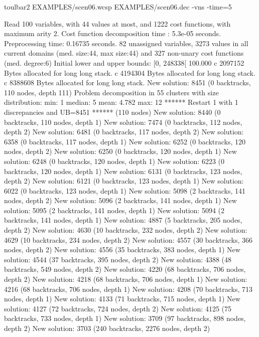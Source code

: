 \begin{enumerate}
\begin{DoxyCode}
	toulbar2 EXAMPLES/scen06.wcsp EXAMPLES/scen06.dec -vns -time=5
\end{DoxyCode}
{\scriptsize
\begin{DoxyCode}
Read 100 variables, with 44 values at most, and 1222 cost functions, with maximum arity 2.
Cost function decomposition time : 5.3e-05 seconds.
Preprocessing time: 0.16735 seconds.
82 unassigned variables, 3273 values in all current domains (med. size:44, max size:44) and 327 non-unary cost functions (med. degree:6)
Initial lower and upper bounds: [0, 248338[ 100.000%
c 2097152 Bytes allocated for long long stack.
c 4194304 Bytes allocated for long long stack.
c 8388608 Bytes allocated for long long stack.
New solution: 8451 (0 backtracks, 110 nodes, depth 111)
Problem decomposition in 55 clusters with size distribution: min: 1 median: 5 mean: 4.782 max: 12
****** Restart 1 with 1 discrepancies and UB=8451 ****** (110 nodes)
New solution: 8440 (0 backtracks, 110 nodes, depth 1)
New solution: 7474 (0 backtracks, 112 nodes, depth 2)
New solution: 6481 (0 backtracks, 117 nodes, depth 2)
New solution: 6358 (0 backtracks, 117 nodes, depth 1)
New solution: 6252 (0 backtracks, 120 nodes, depth 2)
New solution: 6250 (0 backtracks, 120 nodes, depth 1)
New solution: 6248 (0 backtracks, 120 nodes, depth 1)
New solution: 6223 (0 backtracks, 120 nodes, depth 1)
New solution: 6131 (0 backtracks, 123 nodes, depth 2)
New solution: 6121 (0 backtracks, 123 nodes, depth 1)
New solution: 6022 (0 backtracks, 123 nodes, depth 1)
New solution: 5098 (2 backtracks, 141 nodes, depth 2)
New solution: 5096 (2 backtracks, 141 nodes, depth 1)
New solution: 5095 (2 backtracks, 141 nodes, depth 1)
New solution: 5094 (2 backtracks, 141 nodes, depth 1)
New solution: 4887 (5 backtracks, 205 nodes, depth 2)
New solution: 4630 (10 backtracks, 232 nodes, depth 2)
New solution: 4629 (10 backtracks, 234 nodes, depth 2)
New solution: 4557 (30 backtracks, 366 nodes, depth 2)
New solution: 4556 (35 backtracks, 383 nodes, depth 1)
New solution: 4544 (37 backtracks, 395 nodes, depth 2)
New solution: 4388 (48 backtracks, 549 nodes, depth 2)
New solution: 4220 (68 backtracks, 706 nodes, depth 2)
New solution: 4218 (68 backtracks, 706 nodes, depth 1)
New solution: 4216 (68 backtracks, 706 nodes, depth 1)
New solution: 4208 (70 backtracks, 713 nodes, depth 1)
New solution: 4133 (71 backtracks, 715 nodes, depth 1)
New solution: 4127 (72 backtracks, 724 nodes, depth 2)
New solution: 4125 (75 backtracks, 733 nodes, depth 1)
New solution: 3709 (97 backtracks, 898 nodes, depth 2)
New solution: 3703 (240 backtracks, 2276 nodes, depth 2)

\end{DoxyCode}}
\end{enumerate}
